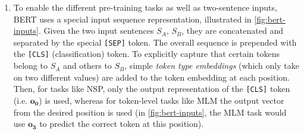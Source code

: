 \documentclass[bsc,frontabs,twoside,singlespacing,parskip,deptreport]{infthesis}
\begin{document}
{{{\begin{enumerate}
        \item To enable the different pre-training tasks as well as two-sentence inputs, BERT uses a special input sequence representation, illustrated in \autoref{fig:bert-inputs}. Given the two input sentences $S_A$, $S_B$, they are concatenated and separated by the special \verb|[SEP]| token. The overall sequence is prepended with the \verb|[CLS]| (classification) token. To explicitly capture that certain tokens belong to $S_A$ and others to $S_B$, simple \textit{token type embeddings} (which only take on two different values) are added to the token embedding at each position. Then, for tasks like NSP, only the output representation of the \verb|[CLS]| token (i.e. $\bm{o_0}$) is used, whereas for token-level tasks like MLM the output vector from the desired position is used (in \autoref{fig:bert-inputs}, the MLM task would use $\bm{o_3}$ to predict the correct token at this position).
      \end{enumerate}

}}}
\end{document}
